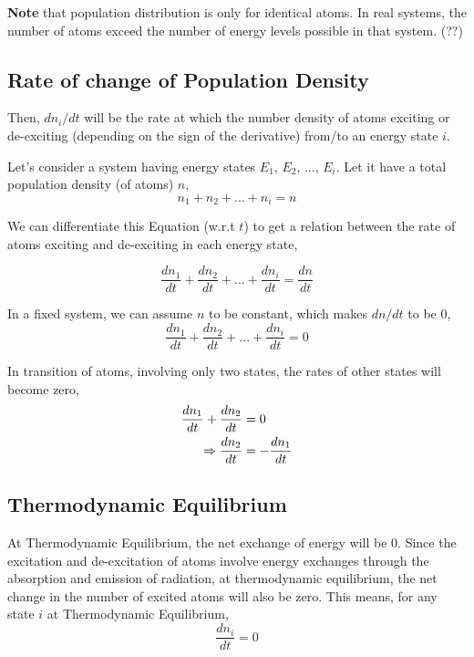 \documentclass[12pt]{article}
\begin{document}
\textbf{Note} that population distribution is only for identical atoms. In real systems, the number of atoms exceed the number of energy levels possible in that system. (??)

\subsection{Rate of change of Population Density}

Then, $dn_{i}/dt$ will be the rate at which the number density of atoms exciting or de-exciting (depending on the sign of the derivative) from/to an energy state $i$. \vspace{.2cm}

Let's consider a system having energy states $E_{1}$, $E_{2}$, ..., $E_{i}$. Let it have a total population density (of atoms) $n$,
\begin{equation}
    n_{1} + n_{2} + ... + n_{i} = n
\end{equation}

We can differentiate this Equation (w.r.t $t$) to get a relation between the rate of atoms exciting and de-exciting in each energy state,

\begin{equation*}
    \frac{dn_{1}}{dt} + \frac{dn_{2}}{dt} + ... + \frac{dn_{i}}{dt} = \frac{dn}{dt}
\end{equation*}

In a fixed system, we can assume $n$ to be constant, which makes $dn/dt$ to be 0,
\begin{equation*}
    \frac{dn_{1}}{dt} + \frac{dn_{2}}{dt} + ... + \frac{dn_{i}}{dt} = 0
\end{equation*} 

In transition of atoms, involving only two states, the rates of other states will become zero,
\begin{align}
    \frac{dn_{1}}{dt} + \frac{dn_{2}}{dt} & = 0 \notag \\
    \Rightarrow \frac{dn_{2}}{dt} & = -\frac{dn_{1}}{dt}
\end{align}

\subsection{Thermodynamic Equilibrium}

At Thermodynamic Equilibrium, the net exchange of energy will be 0. Since the excitation and de-excitation of atoms involve energy exchanges through the absorption and emission of radiation, at thermodynamic equilibrium, the net change in the number of excited atoms will also be zero. This means, for any state $i$ at Thermodynamic Equilibrium, 
\begin{equation}
    \frac{dn_{i}}{dt} = 0
\end{equation}
\end{document}
